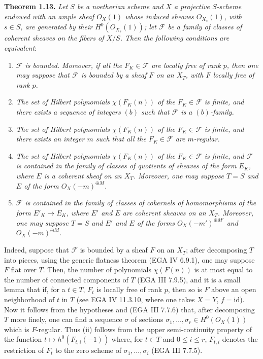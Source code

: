 %
\textbf{Theorem 1.13.}
\emph{Let \(S\) be a noetherian scheme and \(X\) a projective \(S\)-scheme endowed with an ample sheaf \({O}_X(1)\) whose induced sheaves \({O}_{X_s}(1)\), with \(s\in S\), are generated by their \(H^0({O}_{X_s}(1))\); let \(\mathcal F\) be a family of classes of coherent sheaves on the fibers of \(X/S\). Then the following conditions are equivalent}:
\begin{enumerate}[label=(\roman*)]
\item \emph{\(\mathcal F\) is bounded. Moreover, if all the \(F_K\in\mathcal F\) are locally free of rank \(p\), then one may suppose that \(\mathcal F\) is bounded by a sheaf \(F\) on an \(X_T\), with \(F\) locally free of rank \(p\).}
\item \emph{The set of Hilbert polynomials \(\chi(F_K(n))\) of the \(F_K\in\mathcal F\) is finite, and there exists a sequence of integers \((b)\) such that \(\mathcal F\) is a \((b)\)-family.}
\item \emph{The set of Hilbert polynomials \(\chi(F_K(n))\) of the \(F_K\in\mathcal F\) is finite, and there exists an integer \(m\) such that all the \(F_K\in\mathcal F\) are \(m\)-regular.}
\item \emph{The set of Hilbert polynomials \(\chi(F_K(n))\) of the \(F_K\in\mathcal F\) is finite, and \(\mathcal F\) is contained in the family of classes of quotients of sheaves of the form \(E_K\), where \(E\) is a coherent sheaf on an \(X_T\). Moreover, one may suppose \(T=S\) and \(E\) of the form \({O}_X(-m)^{\oplus M}\).}
\item \emph{\(\mathcal F\) is contained in the family of classes of cokernels of homomorphisms of the form \(E'_K\to E_K\), where \(E'\) and \(E\) are coherent sheaves on an \(X_T\). Moreover, one may suppose \(T=S\) and \(E'\) and \(E\) of the forms \({O}_X(-m')^{\oplus M'}\) and \({O}_X(-m)^{\oplus M}\).}
\end{enumerate}
Indeed, suppose that \(\mathcal F\) is bounded by a sheaf \(F\) on an \(X_T\); after decomposing \(T\) into pieces, using the generic flatness theorem (EGA IV 6.9.1), one may suppose \(F\) flat over \(T\). Then,
%
the number of polynomials \(\chi(F(n))\) is at most equal to the number of connected components of \(T\) (EGA III 7.9.5), and it is a small lemma that if, for a \(t\in T\), \(F_t\) is locally free of rank \(p\), then so is \(F\) above an open neighborhood of \(t\) in \(T\) (see EGA IV 11.3.10, where one takes \(X=Y\), \(f=\mathrm{id}\)). Now it follows from the hypotheses and (EGA III 7.7.6) that, after decomposing \(T\) more finely, one can find a sequence \(\sigma\) of sections \(\sigma_1,\ldots,\sigma_r\in H^0({O}_X(1))\) which is \(F\)-regular. Thus (ii) follows from the upper semi-continuity property of the function \(t\longmapsto h^0(F_{t,i}(-1))\) where, for \(t\in T\) and \(0\le i\le r\), \(F_{t,i}\) denotes the restriction of \(F_t\) to the zero scheme of \(\sigma_1,\ldots,\sigma_i\) (EGA III 7.7.5).

